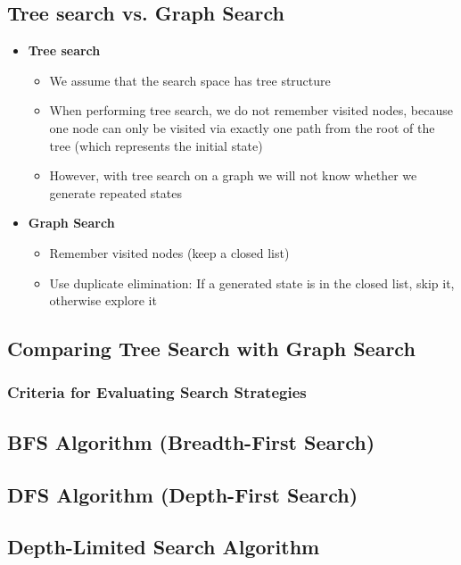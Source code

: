 \documentclass[conference, a4paper]{styles/acmsiggraph}
\begin{document}
    \subsection{Tree search vs. Graph Search}
        \begin{itemize}
            \item \textbf{Tree search}
                \begin{itemize}
                    \item We assume that the search space has tree structure
                    \item When performing tree search, we do not remember visited nodes, because one node can only be visited via exactly one path from the root of the tree (which represents the initial state)
                    \item However, with tree search on a graph we will not know whether we generate repeated states
                \end{itemize}
            \item \textbf{Graph Search}
                \begin{itemize}
                    \item Remember visited nodes (keep a closed list)
                    \item Use duplicate elimination: If a generated state is in the closed list, skip it, otherwise explore it
                \end{itemize}
        \end{itemize}
    
    \subsection{Comparing Tree Search with Graph Search}
        \subsubsection{Criteria for Evaluating Search Strategies}
    \subsection{BFS Algorithm (Breadth-First Search)}
    \subsection{DFS Algorithm (Depth-First Search)}
    \subsection{Depth-Limited Search Algorithm}
\end{document}
